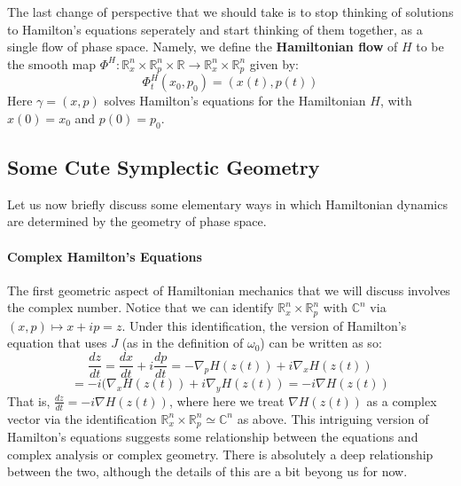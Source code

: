 \documentclass[12pt]{article}
\theoremstyle{definition}
\numberwithin{equation}{section}
\newcommand{\C}{{\mathbb C}}
\newcommand{\R}{{\mathbb R}}
\begin{document}
The last change of perspective that we should take is to stop thinking of solutions to Hamilton's equations seperately and start thinking of them together, as a single flow of phase space. Namely, we define the {\bf Hamiltonian flow} of $H$ to be the smooth map $\Phi^H:\R^n_x \times \R^n_p \times \R \to \R^n_x \times \R^n_p$ given by:
\begin{equation} \label{eqn:flat_hamiltonian_flow}
\Phi^H_t(x_0,p_0) = (x(t),p(t))
\end{equation}
Here $\gamma = (x,p)$ solves Hamilton's equations for the Hamiltonian $H$, with $x(0) = x_0$ and $p(0) = p_0$.

\subsection{Some Cute Symplectic Geometry} \label{subsec:cute_symplectic} Let us now briefly discuss some elementary ways in which Hamiltonian dynamics are determined by the geometry of phase space. 

\paragraph{Complex Hamilton's Equations} \label{obs:hamilton_and_complex_numbers} The first geometric aspect of Hamiltonian mechanics that we will discuss involves the complex number. Notice that we can identify $\R^n_x \times \R^n_p$ with $\C^n$ via $(x,p) \mapsto x + ip = z$. Under this identification, the version of Hamilton's equation that uses $J$ (as in the definition of $\omega_0$) can be written as so:
\[
\frac{dz}{dt} = \frac{dx}{dt} + i \frac{dp}{dt} = -\nabla_p H(z(t)) + i\nabla_x H(z(t))\]
\[ = -i(\nabla_x H(z(t)) + i \nabla_yH(z(t)) = -i\nabla H(z(t))
\]
That is, $\frac{dz}{dt} = -i\nabla H(z(t))$, where here we treat $\nabla H(z(t))$ as a complex vector via the identification $\R^n_x \times \R^n_p \simeq \C^n$ as above. This intriguing version of Hamilton's equations suggests some relationship between the equations and complex analysis or complex geometry. There is absolutely a deep relationship between the two, although the details of this are a bit beyong us for now. 
\end{document}

